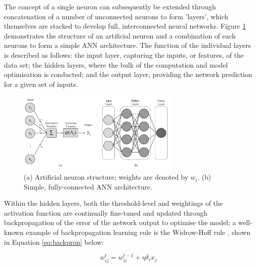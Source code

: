 \documentclass[a4paper, 10pt]{article}
\numberwithin{equation}{section}
\begin{document}
The concept of a single neuron can subsequently be extended through concatenation of a number of unconnected neurons to form 'layers', which themselves are stacked to develop full, interconnected neural networks. Figure \ref{fig:combined_ann} demonstrates the structure of an artificial neuron and a combination of such neurons to form a simple ANN architecture. The function of the individual layers is described as follows: the input layer, capturing the inputs, or features, of the data set; the hidden layers, where the bulk of the computation and model optimisation is conducted; and the output layer, providing the network prediction for a given set of inputs.\medbreak

\begin{figure}[h!]
    \centering
    \includegraphics[width=0.7\textwidth]{images/NN_Generic/combined_ann.pdf}
    \caption{(a) Artificial neuron structure; weights are denoted by $w_i$. (b) Simple, fully-connected ANN architecture.}
    \label{fig:combined_ann}
\end{figure}

Within the hidden layers, both the threshold-level and weightings of the activation function are continually fine-tuned and updated through backpropagation of the error of the network output to optimise the model; a well-known example of backpropagation learning rule is the Widrow-Hoff rule \cite{nn:widrow_hoff}, shown in Equation \ref{eq:backprop} below:

\begin{equation}
\label{eq:backprop}
    w_{ij}^{t} = w_{ij}^{t-1} + \eta\delta_i x_j
\end{equation}
\end{document}

